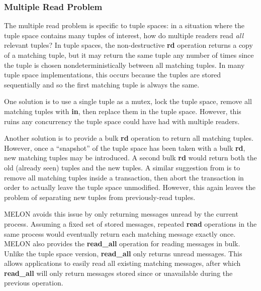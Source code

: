 \documentclass{llncs}
\begin{document}
\subsubsection{Multiple Read Problem}

The multiple read problem \cite{mrdp} is specific to tuple spaces: in a situation where the tuple space contains many tuples of interest, how do multiple readers read \textit{all} relevant tuples? In tuple spaces, the non-destructive \textbf{rd} operation returns a copy of a matching tuple, but it may return the same tuple any number of times since the tuple is chosen nondeterministically between all matching tuples. In many tuple space implementations, this occurs because the tuples are stored sequentially and so the first matching tuple is always the same\cite{de2012new}.

One solution is to use a single tuple as a mutex, lock the tuple space, remove all matching tuples with \textbf{in}, then replace them in the tuple space. However, this ruins any concurrency the tuple space could have had with multiple readers.

Another solution is to provide a bulk \textbf{rd} operation to return all matching tuples. However, once a ``snapshot'' of the tuple space has been taken with a bulk \textbf{rd}, new matching tuples may be introduced. A second bulk \textbf{rd} would return both the old (already seen) tuples and the new tuples. A similar suggestion from \cite{edwards2001jini} is to remove all matching tuples inside a transaction, then abort the transaction in order to actually leave the tuple space unmodified. However, this again leaves the problem of separating new tuples from previously-read tuples.

MELON avoids this issue by only returning messages unread by the current process. Assuming a fixed set of stored messages, repeated \textbf{read} operations in the same process would eventually return each matching message exactly once. MELON also provides the \textbf{read\_all} operation for reading messages in bulk. Unlike the tuple space version, \textbf{read\_all} only returns unread messages. This allows applications to easily read all existing matching messages, after which \textbf{read\_all} will only return messages stored since or unavailable during the previous operation.




\end{document}
